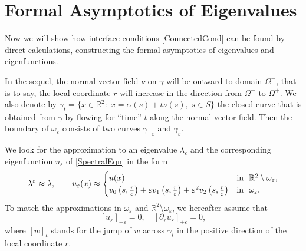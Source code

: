 \documentclass[reqno]{amsart}
\theoremstyle{plain}
\numberwithin{equation}{section}
\newcommand{\Real}{\mathbb R}
\newcommand{\eps}{\varepsilon}
\newcommand\nep{\textstyle\frac r\eps}
\begin{document}

\section{Formal Asymptotics of Eigenvalues}\label{Sec:LimitOperator}

Now we will show how interface conditions \eqref{ConnectedCond} can be found by direct calculations, constructing the formal asymptotics of  eigenvalues and eigenfunctions.

In the sequel, the normal vector field $\nu$ on $\gamma$ will be outward to domain $\Omega^-$, that is to say, the local coordinate $r$ will increase in the direction from $\Omega^-$ to $\Omega^+$. We also denote by $\gamma_t=\{x\in\Real^2\colon\; x=\alpha(s)+t\nu(s), \; s\in S\}$ the closed curve that is obtained from $\gamma$ by flowing for ``time'' $t$ along the normal vector field. Then the boundary of $\omega_\eps$ consists of two curves $\gamma_{-\eps}$ and $\gamma_{\eps}$.

We  look for the  approximation to an eigenvalue $\lambda_\eps$ and the corresponding eigenfunction $u_\eps$ of \eqref{SpectralEqn} in the form
\begin{equation}\label{AsymptoticsUe}
\lambda^\eps\approx \lambda, \qquad u_\eps(x)\approx
\begin{cases}
  u(x)& \hbox{in \ }\Real^2\setminus \omega_\eps, \\
    v_0\left(s,\nep\right)+\eps v_1\left(s,\nep\right)+\eps^2 v_2\left(s,\nep\right)
&\hbox{in \ } \omega_\eps.
\end{cases}
\end{equation}
To match the approximations in $\omega_\eps$ and $\Real^2\setminus \omega_\eps$, we hereafter assume that
\begin{equation}\label{MatchingCnds}
  [u_\eps]_{\pm\eps}=0, \quad [\partial_r u_\eps]_{\pm\eps}=0,
\end{equation}
where  $[w]_t$ stands for  the jump of $w$ across $\gamma_t$ in the positive direction of the local coordinate $r$.
\end{document}
